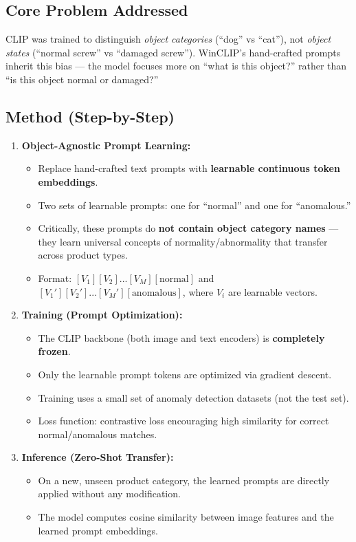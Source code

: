 \documentclass[12pt, a4paper]{article}
\begin{document}
\subsection{Core Problem Addressed}
CLIP was trained to distinguish \textit{object categories} (``dog'' vs ``cat''), not \textit{object states} (``normal screw'' vs ``damaged screw''). WinCLIP's hand-crafted prompts inherit this bias --- the model focuses more on ``what is this object?'' rather than ``is this object normal or damaged?''

\subsection{Method (Step-by-Step)}

\begin{enumerate}[leftmargin=*]
    \item \textbf{Object-Agnostic Prompt Learning:}
    \begin{itemize}
        \item Replace hand-crafted text prompts with \textbf{learnable continuous token embeddings}.
        \item Two sets of learnable prompts: one for ``normal'' and one for ``anomalous.''
        \item Critically, these prompts do \textbf{not contain object category names} --- they learn universal concepts of normality/abnormality that transfer across product types.
        \item Format: $[V_1][V_2]...[V_M][\text{normal}]$ and $[V_1'][V_2']...[V_M'][\text{anomalous}]$, where $V_i$ are learnable vectors.
    \end{itemize}

    \item \textbf{Training (Prompt Optimization):}
    \begin{itemize}
        \item The CLIP backbone (both image and text encoders) is \textbf{completely frozen}.
        \item Only the learnable prompt tokens are optimized via gradient descent.
        \item Training uses a small set of anomaly detection datasets (not the test set).
        \item Loss function: contrastive loss encouraging high similarity for correct normal/anomalous matches.
    \end{itemize}

    \item \textbf{Inference (Zero-Shot Transfer):}
    \begin{itemize}
        \item On a new, unseen product category, the learned prompts are directly applied without any modification.
        \item The model computes cosine similarity between image features and the learned prompt embeddings.
    \end{itemize}
\end{enumerate}
\end{document}
